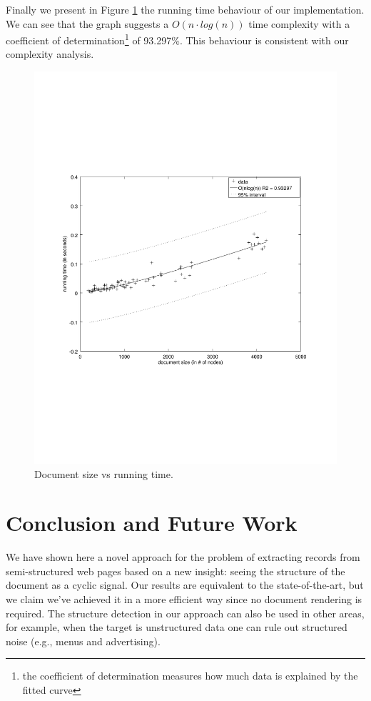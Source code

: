 \documentclass{vldb}
\begin{document}
Finally we present in Figure \ref{fig:runtime} the running time behaviour of our
implementation. We can see that the graph suggests a $O(n\cdot log(n))$
time complexity with a coefficient of determination\footnote{the coefficient of
determination measures how much data is explained by the fitted curve} of
93.297\%. This behaviour is consistent with our complexity analysis.

\begin{figure}[h]
  \centering
     \includegraphics[trim={2.5cm 7.5cm 1cm 6.5cm}, width=\linewidth
     ]{img/runtime.pdf}
  \caption{Document size vs running time.}
  \label{fig:runtime}
\end{figure}

\section{Conclusion and Future Work}\label{sec:con}

We have shown here a novel approach for the problem of extracting records from
semi-structured web pages based on a new insight: seeing the structure of the
document as a cyclic signal. Our results are equivalent to the state-of-the-art,
but we claim we've achieved it in a more efficient way since no document
rendering is required. The structure detection in our approach can also be used
in other areas, for example, when the target is unstructured data one can rule
out structured noise (e.g., menus and advertising).
\end{document}
